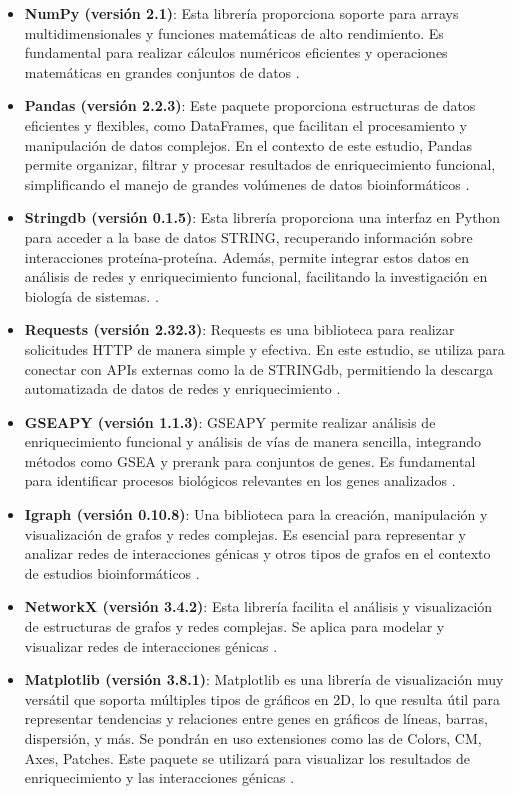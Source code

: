 \begin{itemize}
	\item \textbf{NumPy (versión 2.1)}: Esta librería proporciona soporte para arrays multidimensionales y funciones matemáticas de alto rendimiento. Es fundamental para realizar cálculos numéricos eficientes y operaciones matemáticas en grandes conjuntos de datos \cite{numpy}.
	\item \textbf{Pandas (versión 2.2.3)}: Este paquete proporciona estructuras de datos eficientes y flexibles, como DataFrames, que facilitan el procesamiento y manipulación de datos complejos. En el contexto de este estudio, Pandas permite organizar, filtrar y procesar resultados de enriquecimiento funcional, simplificando el manejo de grandes volúmenes de datos bioinformáticos \cite{pandas}.
	\item \textbf{Stringdb (versión 0.1.5)}: Esta librería proporciona una interfaz en Python para acceder a la base de datos STRING, recuperando información sobre interacciones proteína-proteína. Además, permite integrar estos datos en análisis de redes y enriquecimiento funcional, facilitando la investigación en biología de sistemas. \cite{stringdb}.
	\item \textbf{Requests (versión 2.32.3)}: Requests es una biblioteca para realizar solicitudes HTTP de manera simple y efectiva. En este estudio, se utiliza para conectar con APIs externas como la de STRINGdb, permitiendo la descarga automatizada de datos de redes y enriquecimiento \cite{requests}.
	\item \textbf{GSEAPY (versión 1.1.3)}: GSEAPY permite realizar análisis de enriquecimiento funcional y análisis de vías de manera sencilla, integrando métodos como GSEA y prerank para conjuntos de genes. Es fundamental para identificar procesos biológicos relevantes en los genes analizados \cite{gseapy}.
	\item \textbf{Igraph (versión 0.10.8)}: Una biblioteca para la creación, manipulación y visualización de grafos y redes complejas. Es esencial para representar y analizar redes de interacciones génicas y otros tipos de grafos en el contexto de estudios bioinformáticos \cite{igraph}.
	\item \textbf{NetworkX (versión 3.4.2)}: Esta librería facilita el análisis y visualización de estructuras de grafos y redes complejas. Se aplica para modelar y visualizar redes de interacciones génicas \cite{networkx}.
	\item \textbf{Matplotlib (versión 3.8.1)}: Matplotlib es una librería de visualización muy versátil que soporta múltiples tipos de gráficos en 2D, lo que resulta útil para representar tendencias y relaciones entre genes en gráficos de líneas, barras, dispersión, y más. Se pondrán en uso extensiones como las de Colors, CM, Axes, Patches. Este paquete se utilizará para visualizar los resultados de enriquecimiento y las interacciones génicas \cite{matplotlib}.

\end{itemize}
